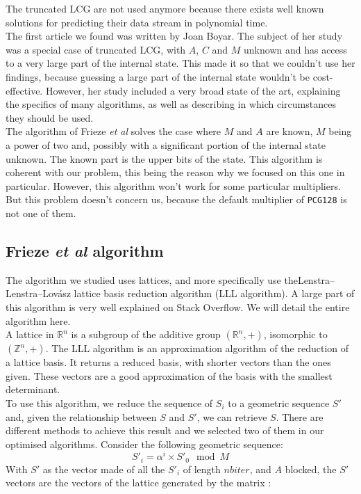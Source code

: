 \documentclass[preprint]{iacrtrans}
\begin{document}
The truncated LCG are not used anymore because there exists well known solutions for predicting their data stream in polynomial time.\\

The first article we found was written by Joan Boyar\cite{Boyar1989}. The subject of her study was a special case of truncated LCG, with $A$, $C$ and $M$ unknown and has access to a very large part of the internal state. This made it so that we couldn't use her findings, because guessing a large part of the internal state wouldn't be cost-effective. However, her study included a very broad state of the art, explaining the specifics of many algorithms, as well as describing in which circumstances they should be used.\\

The algorithm of Frieze \textit{et al}\cite{Frieze} solves the case where $M$ and $A$ are known, $M$ being a power of two and, possibly with a significant portion of the internal state unknown. The known part is the upper bits of the state. This algorithm is coherent with our problem, this being the reason why we focused on this one in particular. However, this algorithm won't work for some particular multipliers. But this problem doesn't concern us, because the default multiplier of \texttt{PCG128} is not one of them.\\

\subsection{Frieze \textit{et al} algorithm}

The algorithm we studied uses lattices, and more specifically use the\break Lenstra–Lenstra–Lovász lattice basis reduction algorithm (LLL algorithm)\cite{LLLpastack}. A large part of this algorithm is very well explained on Stack Overflow\cite{LLLstack}.
We will detail the entire algorithm here.\\

A lattice in $\mathbb{R}^n$ is a subgroup of the additive group $(\mathbb{R}^n,+)$, isomorphic to $(\mathbb{Z}^n,+)$. The LLL algorithm is an approximation algorithm of the reduction of a lattice basis. It returns a reduced basis, with shorter vectors than the ones given. These vectors are a good approximation of the basis with the smallest determinant.\\

To use this algorithm, we reduce the sequence of $S_i$ to a geometric sequence $S'$ and, given the relationship between $S$ and $S'$, we can retrieve $S$. There are different methods to achieve this result and we selected two of them in our optimised algorithms. Consider the following geometric sequence:
\begin{equation}
    S'_i=\alpha ^i \times S'_0 \mod{M}
\end{equation}
With $S'$ as the vector made of all the $S'_i$ of length $nbiter$, and $A$ blocked, the $S'$ vectors are the vectors of the lattice generated by the matrix :
\end{document}
